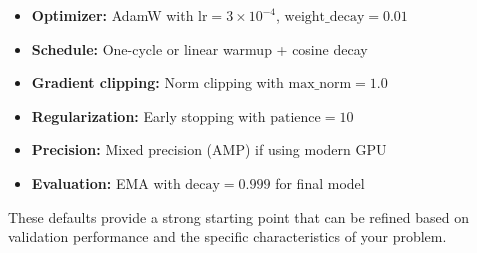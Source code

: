 \documentclass[../main.tex]{subfiles}
\begin{document}
\begin{itemize}
    \item \textbf{Optimizer:} AdamW with $\text{lr}=3 \times 10^{-4}$, $\text{weight\_decay}=0.01$
    \item \textbf{Schedule:} One-cycle or linear warmup + cosine decay
    \item \textbf{Gradient clipping:} Norm clipping with $\text{max\_norm}=1.0$
    \item \textbf{Regularization:} Early stopping with $\text{patience}=10$
    \item \textbf{Precision:} Mixed precision (AMP) if using modern GPU
    \item \textbf{Evaluation:} EMA with $\text{decay}=0.999$ for final model
\end{itemize}

These defaults provide a strong starting point that can be refined based on validation performance and the specific characteristics of your problem.
\end{document}
